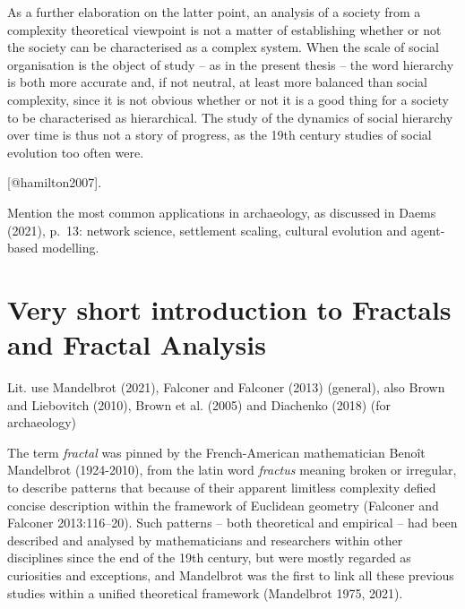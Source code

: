 \documentclass[
  12pt,
]{book}
\begin{document}
As a further elaboration on the latter point, an analysis of a society from a complexity theoretical viewpoint is not a matter of establishing whether or not the society can be characterised as a complex system. When the scale of social organisation is the object of study -- as in the present thesis -- the word hierarchy is both more accurate and, if not neutral, at least more balanced than social complexity, since it is not obvious whether or not it is a good thing for a society to be characterised as hierarchical. The study of the dynamics of social hierarchy over time is thus not a story of progress, as the 19th century studies of social evolution too often were.

{[}@hamilton2007{]}.

Mention the most common applications in archaeology, as discussed in Daems (2021), p.~13: network science, settlement scaling, cultural evolution and agent-based modelling.

\hypertarget{fractals}{%
\section{Very short introduction to Fractals and Fractal Analysis}\label{fractals}}

Lit. use Mandelbrot (2021), Falconer and Falconer (2013) (general), also Brown and Liebovitch (2010), Brown et al. (2005) and Diachenko (2018) (for archaeology)

The term \emph{fractal} was pinned by the French-American mathematician Benoît Mandelbrot (1924-2010), from the latin word \emph{fractus} meaning broken or irregular, to describe patterns that because of their apparent limitless complexity defied concise description within the framework of Euclidean geometry (Falconer and Falconer 2013:116--20). Such patterns -- both theoretical and empirical -- had been described and analysed by mathematicians and researchers within other disciplines since the end of the 19th century, but were mostly regarded as curiosities and exceptions, and Mandelbrot was the first to link all these previous studies within a unified theoretical framework (Mandelbrot 1975, 2021).
\end{document}
